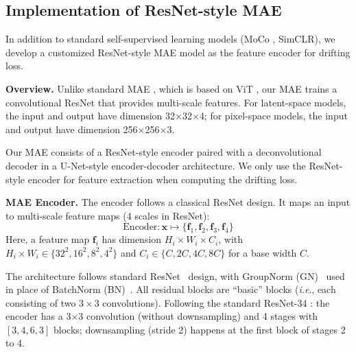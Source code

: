 \documentclass{article}
\renewcommand{\paragraph}[1]{\vspace{.05em}\noindent\textbf{#1}}
\def\onedot{.}
\def\ie{\emph{i.e}\onedot} \def\Ie{\emph{I.e}\onedot}
\theoremstyle{plain}
\theoremstyle{definition}
\theoremstyle{remark}
\begin{document}
\subsection{Implementation of ResNet-style MAE}
\label{sec:appendix_latent_mae}

In addition to standard self-supervised learning models (MoCo \cite{he2020momentum}, SimCLR\cite{chen2020simple}), we develop a customized ResNet-style MAE model as the feature encoder for drifting loss.

\paragraph{Overview.}
Unlike standard MAE \cite{he2022masked}, which is based on ViT \cite{Dosovitskiy2021}, our MAE trains a convolutional ResNet that provides multi-scale features.
For latent-space models, the input and output have dimension 32$\times$32$\times$4;
for pixel-space models, the input and output have dimension 256$\times$256$\times$3.

Our MAE consists of a ResNet-style encoder paired with a deconvolutional decoder in a U-Net-style \cite{ronneberger2015u} encoder-decoder architecture.
We only use the ResNet-style encoder for feature extraction when computing the drifting loss.

\paragraph{MAE Encoder.}
The encoder follows a classical ResNet \cite{he2016deep} design.
It maps an input to multi-scale feature maps (4 scales in ResNet):
\[
\text{Encoder}: \mathbf{x} \mapsto \{\mathbf{f}_1, \mathbf{f}_2, \mathbf{f}_3, \mathbf{f}_4\}
\]
Here, a feature map $\mathbf{f}_i$ has dimension $H_i{\times}W_i{\times}C_i$, with $H_i{\times}W_i \in \{32^2, 16^2, 8^2, 4^2\}$ and $C_i \in \{C, 2C, 4C, 8C\}$ for a base width $C$.

The architecture follows standard ResNet~\citep{he2016deep} design, with GroupNorm (GN)~\citep{wu2018group} used in place of BatchNorm (BN)~\citep{ioffe2015batch}.
All residual blocks are ``basic'' blocks (\ie, each consisting of two $3{\times}3$ convolutions).
Following the standard ResNet-34 \citep{he2016deep}:
the encoder has a 3${\times}$3 convolution (without downsampling) and 4 stages with $[3, 4, 6, 3]$ blocks; downsampling (stride 2) happens at the first block of stages 2 to 4.
\end{document}
